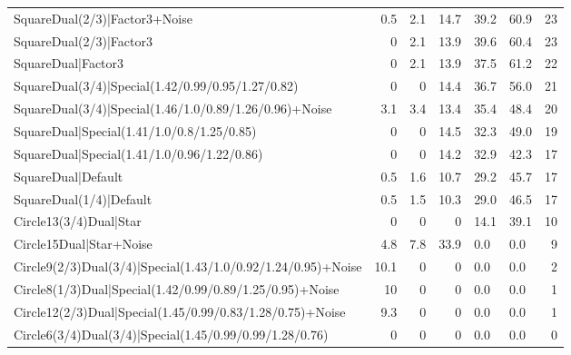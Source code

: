 \begin{tabular}{lrrrllr}
 SquareDual(2/3)|Factor3+Noise                                  &          0.5 &            2.1 &          14.7 & 39.2           & 60.9           &           23 \\
 SquareDual(2/3)|Factor3                                        &          0   &            2.1 &          13.9 & 39.6           & 60.4           &           23 \\
 SquareDual|Factor3                                             &          0   &            2.1 &          13.9 & 37.5           & 61.2           &           22 \\
 SquareDual(3/4)|Special(1.42/0.99/0.95/1.27/0.82)              &          0   &            0   &          14.4 & 36.7           & 56.0           &           21 \\
 SquareDual(3/4)|Special(1.46/1.0/0.89/1.26/0.96)+Noise         &          3.1 &            3.4 &          13.4 & 35.4           & 48.4           &           20 \\
 SquareDual|Special(1.41/1.0/0.8/1.25/0.85)                     &          0   &            0   &          14.5 & 32.3           & 49.0           &           19 \\
 SquareDual|Special(1.41/1.0/0.96/1.22/0.86)                    &          0   &            0   &          14.2 & 32.9           & 42.3           &           17 \\
 SquareDual|Default                                             &          0.5 &            1.6 &          10.7 & 29.2           & 45.7           &           17 \\
 SquareDual(1/4)|Default                                        &          0.5 &            1.5 &          10.3 & 29.0           & 46.5           &           17 \\
 Circle13(3/4)Dual|Star                                         &          0   &            0   &           0   & 14.1           & 39.1           &           10 \\
 Circle15Dual|Star+Noise                                        &          4.8 &            7.8 &          33.9 & 0.0            & 0.0            &            9 \\
 Circle9(2/3)Dual(3/4)|Special(1.43/1.0/0.92/1.24/0.95)+Noise   &         10.1 &            0   &           0   & 0.0            & 0.0            &            2 \\
 Circle8(1/3)Dual|Special(1.42/0.99/0.89/1.25/0.95)+Noise       &         10   &            0   &           0   & 0.0            & 0.0            &            1 \\
 Circle12(2/3)Dual|Special(1.45/0.99/0.83/1.28/0.75)+Noise      &          9.3 &            0   &           0   & 0.0            & 0.0            &            1 \\
 Circle6(3/4)Dual(3/4)|Special(1.45/0.99/0.99/1.28/0.76)        &          0   &            0   &           0   & 0.0            & 0.0            &            0 \\
\hline
\end{tabular}